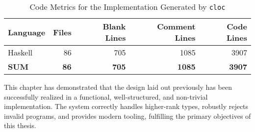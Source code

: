 \begin{table}[h!]
    \centering
    \footnotesize
    \caption{Code Metrics for the \Arralac Implementation Generated by \texttt{cloc}}
    \begin{tabular}{lrrrr}
        \toprule
        \textbf{Language} & \textbf{Files} & \textbf{Blank Lines} & \textbf{Comment Lines} & \textbf{Code Lines} \\
        \midrule
        Haskell           & 86             & 705                  & 1085                   & 3907                \\
        \midrule
        \textbf{SUM}      & \textbf{86}    & \textbf{705}         & \textbf{1085}          & \textbf{3907}       \\
        \bottomrule
    \end{tabular}
    \label{table:cloc}
\end{table}

This chapter has demonstrated that the design laid out previously has been successfully realized in a functional, well-structured, and non-trivial implementation. The system correctly handles higher-rank types, robustly rejects invalid programs, and provides modern tooling, fulfilling the primary objectives of this thesis.